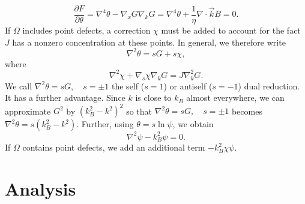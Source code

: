 \documentclass[12pt]{article}
\begin{document}
\begin{enumerate}[(i)]
    \[
        \frac{\partial F}{\partial \theta} = \nabla^4 \theta - \nabla_xG \nabla_kG = \nabla^4\theta + \frac{1}{\eta}\nabla \cdot \vec{k}B=0.
    \] 
    If $\Omega$ includes point defects, a correction $\chi$ must be added to account for the fact $J$ has a nonzero concentration at these points. In general, we therefore write
    \[
    \nabla^2\theta = sG + s\chi,
    \]
    where
    \[
    \nabla^2\chi + \nabla_s \chi \nabla_k G = J\nabla_k^2 G.
    \] 
    We call $\nabla^2\theta = sG, \quad s=\pm 1$ the self ($s=1$) or antiself ($s=-1$) dual reduction. It has a further advantage. Since $k$ is close to $k_B$ almost everywhere, we can approximate $G^2$ by $(k_B^2-k^2)^2$ so that $\nabla^2\theta = sG, \quad s=\pm 1$ becomes $\nabla^2\theta = s(k_B^2-k^2)$. Further, using $\theta = s\ln\psi$, we obtain
    \[
    \nabla^2\psi - k_B^2\psi = 0.
    \] 
    If $\Omega$ contains point defects, we add an additional term $-k_B^2\chi \psi$.
\end{enumerate}
\section{Analysis}
\end{document}
